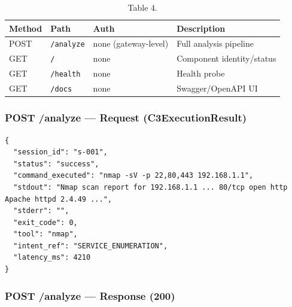 \documentclass[10pt,journal,onecolumn]{IEEEtran}
\begin{document}
\begin{table}[h]
\caption{Table 4.}
\label{tab:t4}
\begin{tabularx}{\columnwidth}{l >{\raggedright\arraybackslash}X >{\raggedright\arraybackslash}X >{\raggedright\arraybackslash}X}
\toprule
\textbf{Method} & \textbf{Path} & \textbf{Auth} & \textbf{Description}\\
\midrule
POST & \texttt{/analyze} & none (gateway-level) & Full analysis pipeline\\
GET & \texttt{/} & none & Component identity/status\\
GET & \texttt{/health} & none & Health probe\\
GET & \texttt{/docs} & none & Swagger/OpenAPI UI\\
\bottomrule
\end{tabularx}
\end{table}

\subsubsection{POST /analyze --- Request (C3ExecutionResult)}

\begin{lstlisting}
{
  "session_id": "s-001",
  "status": "success",
  "command_executed": "nmap -sV -p 22,80,443 192.168.1.1",
  "stdout": "Nmap scan report for 192.168.1.1 ... 80/tcp open http Apache httpd 2.4.49 ...",
  "stderr": "",
  "exit_code": 0,
  "tool": "nmap",
  "intent_ref": "SERVICE_ENUMERATION",
  "latency_ms": 4210
}
\end{lstlisting}

\subsubsection{POST /analyze --- Response (200)}
\end{document}
